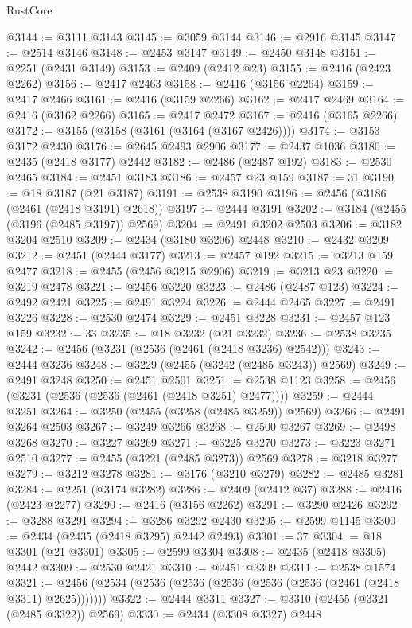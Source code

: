 \begin{lexlean}{RustCore}
\begin{coremodule}
@3144 := @3111 @3143
@3145 := @3059 @3144
@3146 := @2916 @3145
@3147 := @2514 @3146
@3148 := @2453 @3147
@3149 := @2450 @3148
@3151 := @2251 (@2431 @3149)
@3153 := @2409 (@2412 @23)
@3155 := @2416 (@2423 @2262)
@3156 := @2417 @2463
@3158 := @2416 (@3156 @2264)
@3159 := @2417 @2466
@3161 := @2416 (@3159 @2266)
@3162 := @2417 @2469
@3164 := @2416 (@3162 @2266)
@3165 := @2417 @2472
@3167 := @2416 (@3165 @2266)
@3172 := @3155 (@3158 (@3161 (@3164 (@3167 @2426))))
@3174 := @3153 @3172 @2430
@3176 := @2645 @2493 @2906
@3177 := @2437 @1036
@3180 := @2435 (@2418 @3177) @2442
@3182 := @2486 (@2487 @192)
@3183 := @2530 @2465
@3184 := @2451 @3183
@3186 := @2457 @23 @159
@3187 := 31
@3190 := @18 @3187 (@21 @3187)
@3191 := @2538 @3190
@3196 := @2456 (@3186 (@2461 (@2418 @3191) @2618))
@3197 := @2444 @3191
@3202 := @3184 (@2455 (@3196 (@2485 @3197)) @2569)
@3204 := @2491 @3202 @2503
@3206 := @3182 @3204 @2510
@3209 := @2434 (@3180 @3206) @2448
@3210 := @2432 @3209
@3212 := @2451 (@2444 @3177)
@3213 := @2457 @192
@3215 := @3213 @159 @2477
@3218 := @2455 (@2456 @3215 @2906)
@3219 := @3213 @23
@3220 := @3219 @2478
@3221 := @2456 @3220
@3223 := @2486 (@2487 @123)
@3224 := @2492 @2421
@3225 := @2491 @3224
@3226 := @2444 @2465
@3227 := @2491 @3226
@3228 := @2530 @2474
@3229 := @2451 @3228
@3231 := @2457 @123 @159
@3232 := 33
@3235 := @18 @3232 (@21 @3232)
@3236 := @2538 @3235
@3242 := @2456 (@3231 (@2536 (@2461 (@2418 @3236) @2542)))
@3243 := @2444 @3236
@3248 := @3229 (@2455 (@3242 (@2485 @3243)) @2569)
@3249 := @2491 @3248
@3250 := @2451 @2501
@3251 := @2538 @1123
@3258 := @2456 (@3231 (@2536 (@2536 (@2461 (@2418 @3251) @2477))))
@3259 := @2444 @3251
@3264 := @3250 (@2455 (@3258 (@2485 @3259)) @2569)
@3266 := @2491 @3264 @2503
@3267 := @3249 @3266
@3268 := @2500 @3267
@3269 := @2498 @3268
@3270 := @3227 @3269
@3271 := @3225 @3270
@3273 := @3223 @3271 @2510
@3277 := @2455 (@3221 (@2485 @3273)) @2569
@3278 := @3218 @3277
@3279 := @3212 @3278
@3281 := @3176 (@3210 @3279)
@3282 := @2485 @3281
@3284 := @2251 (@3174 @3282)
@3286 := @2409 (@2412 @37)
@3288 := @2416 (@2423 @2277)
@3290 := @2416 (@3156 @2262)
@3291 := @3290 @2426
@3292 := @3288 @3291
@3294 := @3286 @3292 @2430
@3295 := @2599 @1145
@3300 := @2434 (@2435 (@2418 @3295) @2442 @2493)
@3301 := 37
@3304 := @18 @3301 (@21 @3301)
@3305 := @2599 @3304
@3308 := @2435 (@2418 @3305) @2442
@3309 := @2530 @2421
@3310 := @2451 @3309
@3311 := @2538 @1574
@3321 := @2456 (@2534 (@2536 (@2536 (@2536 (@2536 (@2536 (@2461 (@2418 @3311) @2625)))))))
@3322 := @2444 @3311
@3327 := @3310 (@2455 (@3321 (@2485 @3322)) @2569)
@3330 := @2434 (@3308 @3327) @2448

\end{coremodule}
\end{lexlean}
